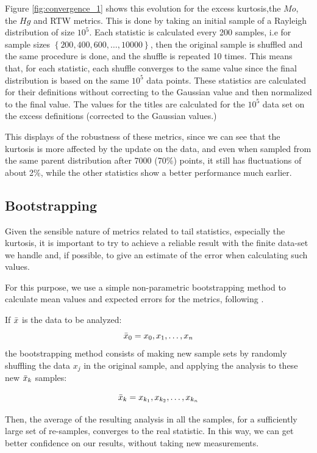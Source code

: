 	Figure \ref{fig:convergence_1} shows this evolution for the excess kurtosis,the $Mo$, the $Hg$ and RTW metrics.
	This is done by taking an initial sample of a Rayleigh distribution of size $10^5$. 
	Each statistic is calculated every 200 samples, i.e for sample sizes $\left\lbrace 200, 400, 600, \dots, 10000\right\rbrace$, then the original sample is shuffled and the same procedure is done, and the shuffle is repeated 10 times.
	This means that, for each statistic, each shuffle converges to the same value since the final distribution is based on the same $10^5$ data points.  
	These statistics are calculated for their definitions without correcting to the Gaussian value and then normalized to the final value. 
	The values for the titles are calculated for the  $10^5$ data set on the excess definitions (corrected to the Gaussian values.)
	
	This displays of the robustness of these metrics, since we can see that the kurtosis is more affected by the update on the data, and even when sampled from the same parent distribution after 7000 (70\%) points, it still has fluctuations of about 2\%, while the other statistics show a better performance much earlier.	
	
	
	\subsection{Bootstrapping}
	\label{sec:EWS_boots}
	Given the sensible nature of metrics related to tail statistics, especially the kurtosis, 
	it is important to try to achieve a reliable result with the finite data-set we handle and, if possible, to give an estimate of the error when calculating such values. 
	
	For this purpose, we use a simple non-parametric bootstrapping method to calculate mean values and expected errors for the metrics, following  \cite{Wright2011}. 
	
	If $\Bar{x}$ is the data to be analyzed:
	\[
	\Bar{x}_0={x_0,x_1,\dots,x_n}
	\]
	the bootstrapping method consists of making new sample sets by randomly shuffling the data ${x_j}$ in the original sample, and applying the analysis to these new $\Bar{x}_k$ samples:
	
	\[
	\Bar{x}_k={x_{k_1},x_{k_2},\dots,x_{k_n}}
	\]
	
	Then, the average of the resulting analysis in all the samples, for a sufficiently large set of re-samples, converges to the real statistic. 
	In this way, we can get better confidence on our results, without taking new measurements.
	
